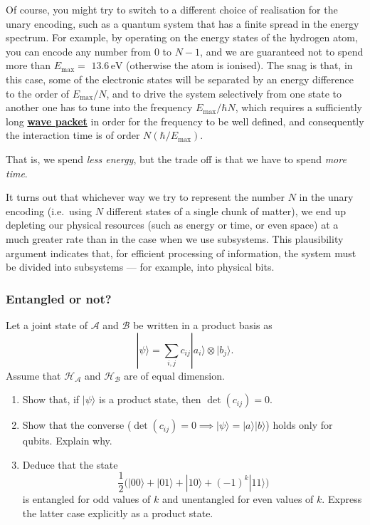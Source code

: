 \documentclass[fleqn,a4paper]{article}
\theoremstyle{definition}
\theoremstyle{definition}
\theoremstyle{definition}
\theoremstyle{definition}
\theoremstyle{remark}
\begin{document}
Of course, you might try to switch to a different choice of realisation for the unary encoding, such as a quantum system that has a finite spread in the energy spectrum.
For example, by operating on the energy states of the hydrogen atom, you can encode any number from \(0\) to \(N-1\), and we are guaranteed not to spend more than \(E_{\mathrm{max}}=\) \(13.6\,\mathrm{eV}\) (otherwise the atom is ionised).
The snag is that, in this case, some of the electronic states will be separated by an energy difference to the order of \(E_{\mathrm{max}}/N\), and to drive the system selectively from one state to another one has to tune into the frequency \(E_{\mathrm{max}}/\hbar N\), which requires a sufficiently long \href{https://en.wikipedia.org/wiki/Wave_packet}{\textbf{wave packet}} in order for the frequency to be well defined, and consequently the
interaction time is of order \(N(\hbar/E_{\mathrm{max}})\).

That is, we spend \emph{less energy}, but the trade off is that we have to spend \emph{more time}.

It turns out that whichever way we try to represent the number \(N\) in the unary encoding (i.e.~using \(N\) different states of a single chunk of matter), we end up depleting our physical resources (such as energy or time, or even space) at a much greater rate than in the case when we use subsystems.
This plausibility argument indicates that, for efficient processing of information, the system must be divided into subsystems --- for example, into physical bits.

\hypertarget{entangled-or-not}{%
\subsubsection{Entangled or not?}\label{entangled-or-not}}

Let a joint state of \(\mathcal{A}\) and \(\mathcal{B}\) be written in a product basis as
\[
  |\psi\rangle = \sum_{i,j} c_{ij}|a_i\rangle\otimes|b_j\rangle.
\]
Assume that \(\mathcal{H}_{\mathcal{A}}\) and \(\mathcal{H}_{\mathcal{B}}\) are of equal dimension.

\begin{enumerate}
\def\labelenumi{\arabic{enumi}.}
\item
  Show that, if \(|\psi\rangle\) is a product state, then \(\det (c_{ij}) = 0\).
\item
  Show that the converse (\(\det(c_{ij})=0\implies|\psi\rangle=|a\rangle|b\rangle\)) holds only for qubits. Explain why.
\item
  Deduce that the state
  \[
   \frac{1}{2}\big(|00\rangle + |01\rangle + |10\rangle + (-1)^k|11\rangle\big)
    \]
  is entangled for odd values of \(k\) and unentangled for even values of \(k\). Express the latter case explicitly as a product state.
\end{enumerate}
\end{document}
